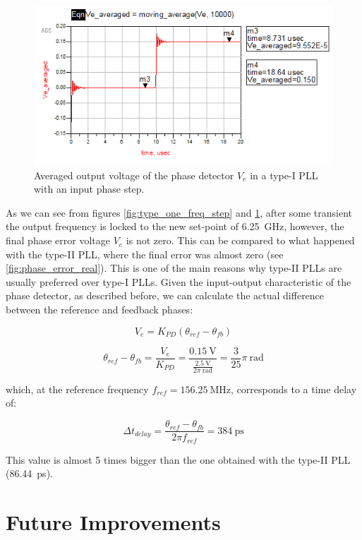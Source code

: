 \documentclass[lettersize,journal]{IEEEtran}
\begin{document}
\begin{figure}[!h]
    \centering
    \includegraphics[width=1\linewidth]{images/type_one_pll/freq_step_error.png}
    \caption{Averaged output voltage of the phase detector $V_e$ in a type-I PLL with an input phase step.}
    \label{fig:type_one_freq_step_error}
\end{figure}

As we can see from figures \ref{fig:type_one_freq_step} and \ref{fig:type_one_freq_step_error}, after some transient the output frequency is locked to the new set-point of \qty{6.25}{\giga\hertz}, however, the final phase error voltage $V_e$ is not zero. This can be compared to what happened with the type-II PLL, where the final error was almost zero (see \ref{fig:phase_error_real}). This is one of the main reasons why type-II PLLs are usually preferred over type-I PLLs.
Given the input-output characteristic of the phase detector, as described before, we can calculate the actual difference between the reference and feedback phases:

\[V_e=K_{PD}\left(\theta_{ref}-\theta_{fb}\right) \]

\[\theta_{ref}-\theta_{fb}=\frac{V_e}{K_{PD}}=\frac{\qty{0.15}{\volt}}{\frac{\qty{2.5}{\volt}}{2\pi\ \unit{\radian}}}=\frac{3}{25}\pi\ \unit{\radian}\]

which, at the reference frequency $f_{ref}=\qty{156.25}{\mega\hertz}$, corresponds to a time delay of:

\[\Delta t_{delay}=\frac{\theta_{ref}-\theta_{fb}}{2\pi f_{ref}}=\qty{384}{\pico\second}\]

This value is almost 5 times bigger than the one obtained with the type-II PLL (\qty{86.44}{\pico\second}).

\section{Future Improvements}
\label{sec:future_improvements}
\end{document}
